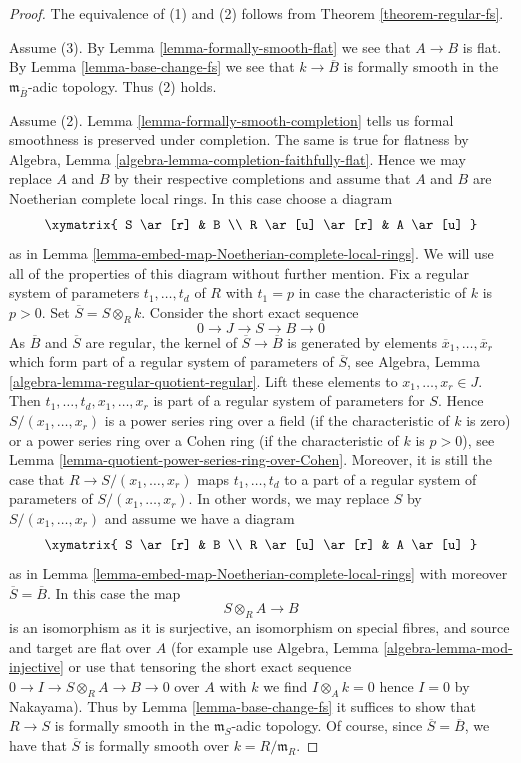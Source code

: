 \begin{proof}
The equivalence of (1) and (2) follows from Theorem \ref{theorem-regular-fs}.

\medskip\noindent
Assume (3). By Lemma \ref{lemma-formally-smooth-flat} we see that
$A \to B$ is flat. By Lemma \ref{lemma-base-change-fs} we see that
$k \to \overline{B}$ is formally smooth in the
$\mathfrak m_{\overline{B}}$-adic topology. Thus (2) holds.

\medskip\noindent
Assume (2). Lemma \ref{lemma-formally-smooth-completion}
tells us formal smoothness is preserved under completion. The same is true
for flatness by Algebra, Lemma \ref{algebra-lemma-completion-faithfully-flat}.
Hence we may replace $A$ and $B$ by their respective completions and
assume that $A$ and $B$ are Noetherian complete local rings.
In this case choose a diagram
$$
\xymatrix{
S \ar[r] & B \\
R \ar[u] \ar[r] & A \ar[u]
}
$$
as in Lemma \ref{lemma-embed-map-Noetherian-complete-local-rings}.
We will use all of the properties of this diagram without further mention.
Fix a regular system of parameters $t_1, \ldots, t_d$ of $R$
with $t_1 = p$ in case the characteristic of $k$ is $p > 0$.
Set $\overline{S} = S \otimes_R k$. Consider the short exact sequence
$$
0 \to J \to S \to B \to 0
$$
As $\overline{B}$ and $\overline{S}$ are regular, the kernel of
$\overline{S} \to \overline{B}$ is generated by elements
$\overline{x}_1, \ldots, \overline{x}_r$ which form part of a regular
system of parameters of $\overline{S}$, see
Algebra, Lemma \ref{algebra-lemma-regular-quotient-regular}.
Lift these elements to $x_1, \ldots, x_r \in J$. Then
$t_1, \ldots, t_d, x_1, \ldots, x_r$ is part of a regular system of
parameters for $S$. Hence $S/(x_1, \ldots, x_r)$ is a power
series ring over a field (if the characteristic of $k$ is zero)
or a power series ring over a Cohen ring (if the characteristic of
$k$ is $p > 0$), see
Lemma \ref{lemma-quotient-power-series-ring-over-Cohen}.
Moreover, it is still the case that $R \to S/(x_1, \ldots, x_r)$
maps $t_1, \ldots, t_d$ to a part of a regular system of parameters
of $S/(x_1, \ldots, x_r)$. In other words, we may replace $S$ by
$S/(x_1, \ldots, x_r)$ and assume we have a diagram
$$
\xymatrix{
S \ar[r] & B \\
R \ar[u] \ar[r] & A \ar[u]
}
$$
as in Lemma \ref{lemma-embed-map-Noetherian-complete-local-rings}
with moreover $\overline{S} = \overline{B}$. In this case the map
$$
S \otimes_R A \longrightarrow B
$$
is an isomorphism as it is surjective, an isomorphism on special
fibres, and source and target are flat over $A$ (for example use
Algebra, Lemma \ref{algebra-lemma-mod-injective} or use that
tensoring the short exact sequence $0 \to I \to S \otimes_R A \to B \to 0$
over $A$ with $k$ we find $I \otimes_A k = 0$ hence $I = 0$ by Nakayama).
Thus by Lemma \ref{lemma-base-change-fs}
it suffices to show that $R \to S$ is formally
smooth in the $\mathfrak m_S$-adic topology.
Of course, since $\overline{S} = \overline{B}$, we have
that $\overline{S}$ is formally smooth over $k = R/\mathfrak m_R$.


\end{proof}
